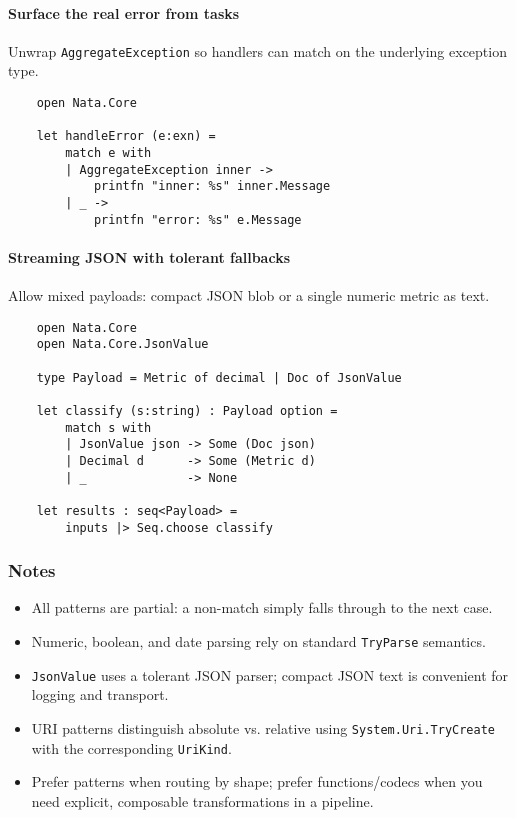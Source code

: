 \documentclass{article}
\begin{document}
\paragraph{Surface the real error from tasks}
Unwrap \texttt{AggregateException} so handlers can match on the underlying exception type.
\begin{verbatim}
    open Nata.Core

    let handleError (e:exn) =
        match e with
        | AggregateException inner ->
            printfn "inner: %s" inner.Message
        | _ ->
            printfn "error: %s" e.Message
\end{verbatim}

\paragraph{Streaming JSON with tolerant fallbacks}
Allow mixed payloads: compact JSON blob or a single numeric metric as text.
\begin{verbatim}
    open Nata.Core
    open Nata.Core.JsonValue

    type Payload = Metric of decimal | Doc of JsonValue

    let classify (s:string) : Payload option =
        match s with
        | JsonValue json -> Some (Doc json)
        | Decimal d      -> Some (Metric d)
        | _              -> None

    let results : seq<Payload> =
        inputs |> Seq.choose classify
\end{verbatim}

\subsubsection{Notes}
\begin{itemize}
  \item All patterns are partial: a non-match simply falls through to the next case.
  \item Numeric, boolean, and date parsing rely on standard \texttt{TryParse} semantics.
  \item \texttt{JsonValue} uses a tolerant JSON parser; compact JSON text is convenient for logging and transport.
  \item URI patterns distinguish absolute vs. relative using \texttt{System.Uri.TryCreate} with the corresponding \texttt{UriKind}.
  \item Prefer patterns when routing by shape; prefer functions/codecs when you need explicit, composable transformations in a pipeline.
\end{itemize}
\end{document}
